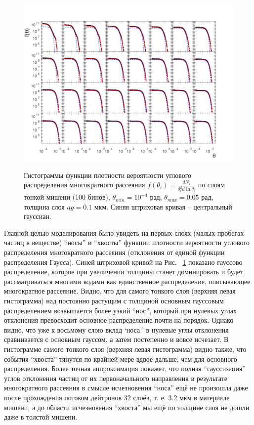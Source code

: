 \documentclass[a4paper,12pt]{article}
\begin{document}
\begin{large}
  \begin{figure}[ht]
    {
       \includegraphics[width=.99\linewidth]{images/thin_theta}
    }
    \caption{Гистограммы функции плотности вероятности углового распределения многократного рассеяния $f(\theta_i)=\frac{dN_i}{\theta_i^2d\ln{\theta_i}}$ по слоям  тонкой мишени (100 бинов), $\theta_{min}=10^{-4}$ рад, $\theta_{max}=0.05$ рад, толщина слоя $ag=0.1$ мкм. Синяя штриховая кривая -- центральный гауссиан.}
    \label{fig:Thin_theta}
  \end{figure}

  Главной целью моделирования было увидеть на первых слоях (малых пробегах частиц в веществе) ``носы'' и ``хвосты'' функции плотности вероятности углового распределения многократного рассеяния (отклонения от единой функции распределения Гаусса).
  Синей штриховой кривой на Рис. ~\ref{fig:Thin_theta} показано гауссово распределение, которое при увеличении толщины станет доминировать и будет рассматриваться многими кодами как единственное распределение, описывающее многократное рассеяние.
  Видно, что для самого тонкого слоя (верхняя левая гистограмма) над постоянно растущим с толщиной основным гауссовым распределением возвышается более узкий ``нос'', который при нулевых углах отклонения превосходит основное распределение почти на порядок.
  Однако видно, что уже к восьмому слою вклад `носа'' в нулевые углы отклонения сравнивается с основным гауссом, а затем постепенно и вовсе исчезает.
  В гистограмме самого тонкого слоя (верхняя левая гистограмма) видно также, что события ``хвоста'' тянутся по крайней мере вдвое дальше, чем для основного распределения.
  Более точная аппроксимация покажет, что полная ``гауссизация'' углов отклонения частиц от их первоначального направления в результате многократного рассеяния в смысле исчезновения ``носа'' ещё не произошла даже после прохождения потоком дейтронов 32 слоёв, т. е. 3.2 мкм в материале мишени, а до области исчезновения ``хвоста'' мы ещё по толщине слоя не дошли даже в толстой мишени.


\end{large}
\end{document}
